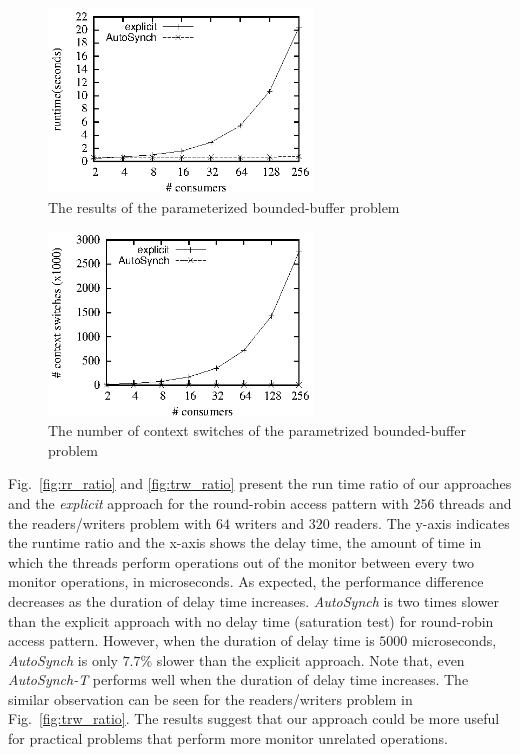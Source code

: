 \documentclass{sigplanconf}
\begin{document}
\begin{figure}[ht!]
  \centering
  \includegraphics[width=70mm]{fig/rpc.eps}
  \caption{The results of the parameterized bounded-buffer problem}
  \label{fig:rpc_eval}
\end{figure}

\begin{figure}[ht!]
  \centering
  \includegraphics[width=70mm]{fig/csrpc.eps}
  \caption{The number of context switches of the parametrized bounded-buffer 
  problem}
\label{fig:csrpc_eval}
\end{figure}

Fig.~\ref{fig:rr_ratio} and \ref{fig:trw_ratio} present the run time ratio of
our approaches and the {\em explicit} approach for the round-robin access
pattern with $256$ threads and the readers/writers problem with $64$ writers 
and $320$ readers. The y-axis indicates the runtime ratio and the x-axis shows
the delay time, the amount of time in which the threads perform 
operations out of the monitor between every two monitor operations, in microseconds. 
As expected, the performance difference decreases as the duration of delay time
increases. {\em AutoSynch} is two times slower than the explicit approach with no
delay time (saturation test) for round-robin access pattern. However, when the
duration of delay time is $5000$ microseconds, {\em AutoSynch} is only 
$7.7\%$ slower than the explicit approach. Note that, even {\em AutoSynch-T}
performs well when the duration of delay time increases. The similar 
observation can be seen for the readers/writers
problem in Fig.~\ref{fig:trw_ratio}. The results suggest that our approach
could be more useful for practical problems that perform more monitor unrelated
operations. 
\end{document}
